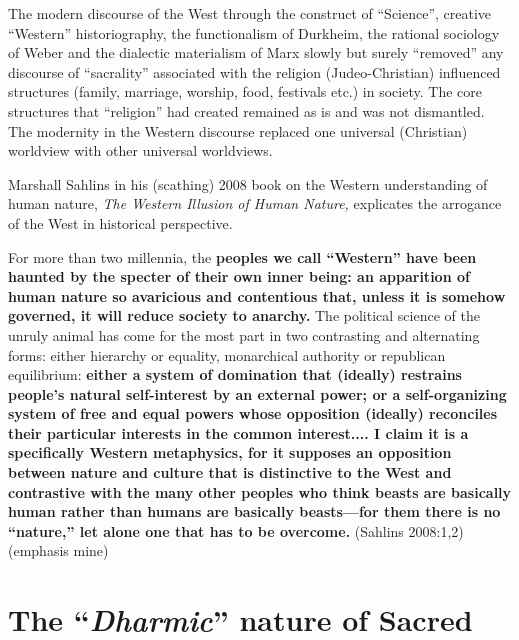 The modern discourse of the West through the construct of “Science”, creative “Western” historiography, the functionalism of Durkheim, the rational sociology of Weber and the dialectic materialism of Marx slowly but surely “removed” any discourse of “sacrality” associated with the religion (Judeo-Christian) influenced structures (family, marriage, worship, food, festivals etc.) in society. The core structures that “religion” had created remained as is and was not dismantled. The modernity in the Western discourse replaced one universal (Christian) worldview with other universal worldviews.

Marshall Sahlins in his (scathing) 2008 book on the Western understanding of human nature, \textit{The Western Illusion of Human Nature,} explicates the arrogance of the West in historical perspective.

For more than two millennia, the \textbf{peoples we call “Western” have been haunted by the specter of their own inner being: an apparition of human nature so avaricious and contentious that, unless it is somehow governed, it will reduce society to anarchy.} The political science of the unruly animal has come for the most part in two contrasting and alternating forms: either hierarchy or equality, monarchical authority or republican equilibrium: \textbf{either a system of domination that (ideally) restrains people's natural self-interest by an external power; or a self-organizing system of free and equal powers whose opposition (ideally) reconciles their particular interests in the common interest.... I claim it is a specifically Western metaphysics, for it supposes an opposition between nature and culture that is distinctive to the West and contrastive with the many other peoples who think beasts are basically human rather than humans are basically beasts—for them there is no “nature,” let alone one that has to be overcome.} \hfill (Sahlins 2008:1,2) (emphasis mine)


\section*{The “\textit{Dharmic}” nature of Sacred}


